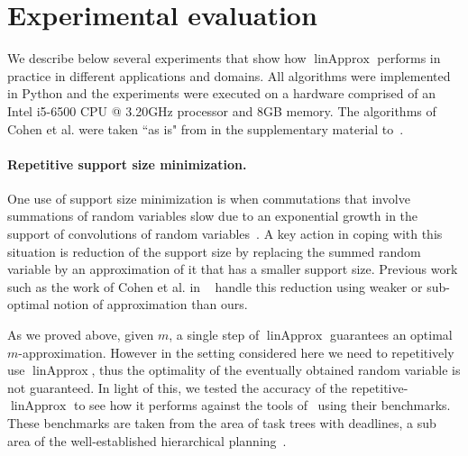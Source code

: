 \documentclass[letterpaper]{article} %
\DeclareMathOperator{\KlmApprox}{linApprox}
\begin{document}
\section{Experimental evaluation}\label{sec:exp}

We describe below several experiments that show how $\KlmApprox$ performs in practice in different applications and domains.
All algorithms were implemented in Python and the experiments were executed on a hardware comprised of an Intel i5-6500 CPU @ 3.20GHz processor and 8GB memory. The algorithms of Cohen et al. were taken ``as is" from in the supplementary material to~\cite{cohen2015estimating}.

\paragraph{Repetitive support size minimization.} One use of support size minimization is when commutations that involve summations of random variables slow due to an exponential growth in the support of convolutions of random variables~\cite{cohen2015estimating}. A key action in coping with this situation is reduction of the  support size by replacing the summed random variable by an approximation of it that has a smaller support size. Previous work such as the work of Cohen et al. in ~ handle this reduction using weaker or sub-optimal notion of approximation than ours. 

As we proved above, given $m$, a single step of $\KlmApprox$ guarantees an optimal $m$-approximation. However in the setting considered here we need to repetitively use $\KlmApprox$, thus the optimality of the eventually obtained random variable is not guaranteed. In light of this, we tested the accuracy of the repetitive-$\KlmApprox$ to see how it performs against the tools of~\cite{cohen2015estimating,CohenGW18} using their benchmarks. These benchmarks are taken from the area of task trees with deadlines, a sub area of the well-established hierarchical planning~\cite{thomas1988hierarchical,alford2016hierarchical,xiao2017hierarchical}.

\end{document}
